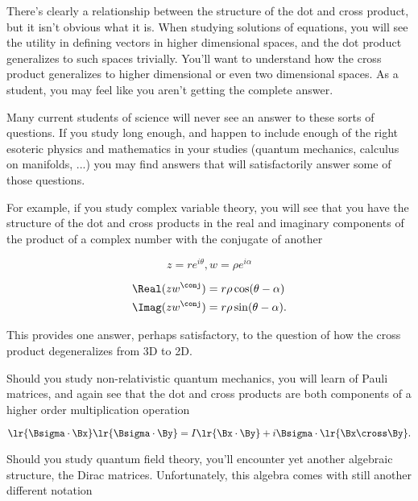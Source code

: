 There's clearly a relationship between the structure of the dot and cross product, but it isn't obvious what it is.  When studying solutions of equations, you will see the utility in defining vectors in higher dimensional spaces, and the dot product generalizes to such spaces trivially.  You'll want to understand how the cross product generalizes to higher dimensional or even two dimensional spaces.  
As a student, you may feel like you aren't getting the complete answer.  

Many current students of science will never see an answer to these sorts of questions.  If you study long enough, and happen to include 
enough of the right esoteric physics and mathematics in your studies (quantum mechanics, calculus on manifolds, ...) you 
may find answers that will satisfactorily answer some of those questions.

For example, if you study complex variable theory, you will see that you have the structure of the dot and cross products in the real and imaginary components of the product of a complex number with the conjugate of another

\begin{equation}\label{eqn:GAIntroduction:80}
z = r e^{i \theta}, w = \rho e^{i \alpha}
\end{equation}

\begin{equation}\label{eqn:GAIntroduction:100}
\begin{aligned}
\Real( z w^\conj ) &= r \rho \cos(\theta - \alpha) \\
\Imag( z w^\conj ) &= r \rho \sin(\theta - \alpha).
\end{aligned}
\end{equation}

This provides one answer, perhaps satisfactory, to the question of how the cross product degeneralizes from 3D to 2D.

Should you study non-relativistic quantum mechanics, you will learn of Pauli matrices, and again see that the dot and cross products are both components of a higher order multiplication operation

\begin{equation}\label{eqn:GAIntroduction:120}
\lr{\Bsigma \cdot \Bx }
\lr{\Bsigma \cdot \By }
=
I \lr{ \Bx \cdot \By } + i \Bsigma \cdot \lr{ \Bx \cross \By }.
\end{equation}

Should you study quantum field theory, you'll encounter yet another algebraic structure, the Dirac matrices.  
Unfortunately, this algebra comes with still another different notation

